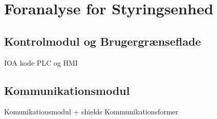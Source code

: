 
\section{Foranalyse for Styringsenhed}

\subsection{Kontrolmodul og Brugergrænseflade}

IOA kode
PLC og HMI

\subsection{Kommunikationsmodul}

Komunikationsmodul + shields
Kommunikationsformer

